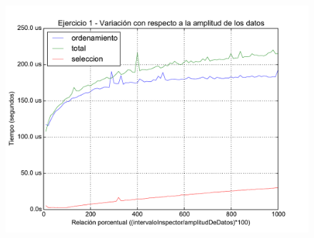 \documentclass[11pt, a4paper, twoside]{article}
\begin{document}
\clearpage
\begin{figure}[H]
   \begin{center}
   \includegraphics[width=1.4\textwidth,angle=90]{../ej1/graficos/test_3.pdf}
   \caption{}
   \label{fig:ej1-3}
   \end{center}
\end{figure}







\end{document}
